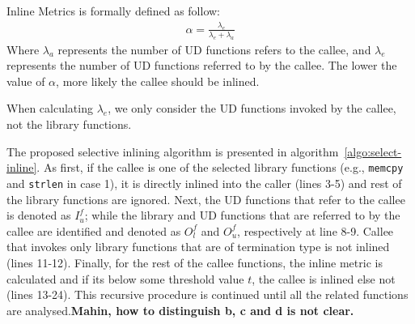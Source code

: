 Inline Metrics is formally defined as follow:
\begin{equation}
\begin{aligned}
 \alpha = \frac{\lambda_e}{\lambda_e + \lambda_a}
\end{aligned}
\end{equation}
Where $\lambda_a$ represents the number of UD functions  refers to the callee, and  $\lambda_e$ represents the number of UD functions  referred to by the callee. The lower the value of $\alpha$, more likely the callee should be inlined.  %

When calculating $\lambda_e$, we only consider the UD functions invoked by the callee, not the library functions. 


The proposed selective inlining algorithm is presented in algorithm~\ref{algo:select-inline}. As first, if the callee is one of the selected library functions (e.g., \texttt{memcpy} and \texttt{strlen} in case 1), it is directly inlined into the caller (lines 3-5) and rest of the library functions are ignored. Next, the UD functions that refer to the callee is denoted as $I_u^f$; while the library and UD functions that are referred to by the callee are identified and denoted as $O_l^f$ and $O_u^f$, respectively at line 8-9. Callee that invokes only library functions that are of termination type is not inlined (lines 11-12). Finally, for the rest of the callee functions, the inline metric is calculated and if its below some threshold value $t$, the callee is inlined else not (lines 13-24). This recursive procedure is continued until all the related functions are analysed.\textbf{Mahin, how to distinguish b, c and d is not clear.}

